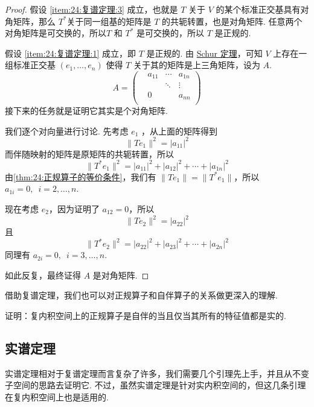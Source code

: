 \begin{proof}
    假设 \ref*{item:24:复谱定理:3} 成立，也就是 $ T $ 关于 $ V $ 的某个标准正交基具有对角矩阵，那么 $ T^* $关于同一组基的矩阵是 $ T $ 的共轭转置，也是对角矩阵. 任意两个对角矩阵是可交换的，所以$ T $ 和 $ T^* $ 是可交换的，所以 $ T $ 是正规的.

    假设 \ref*{item:24:复谱定理:1} 成立，即 $ T $ 是正规的. 由 \hyperref[thm:23:Schur]{Schur 定理}，可知 $ V $ 上存在一组标准正交基 $ (e_1, \ldots , e_n) $ 使得 $ T $ 关于其的矩阵是上三角矩阵，设为 $ A $.
    \[ A = \begin{pmatrix}
             & a_{11} & \cdots & a_{1n} \\
             &        & \ddots & \vdots \\
             & 0      &        & a_{nn} \\
        \end{pmatrix} \]
    接下来的任务就是证明它其实是个对角矩阵.

    我们逐个对向量进行讨论. 先考虑 $ e_1 $ ，从上面的矩阵得到
    \[ \lVert Te_1 \rVert^2 = \lvert a_{11} \rvert^2 \]
    而伴随映射的矩阵是原矩阵的共轭转置，所以
    \[ \lVert T^*e_1 \rVert^2 = \lvert a_{11} \rvert^2 + \lvert a_{12} \rvert^2 + \cdots + \lvert a_{1n} \rvert^2 \]
    由\autoref{thm:24:正规算子的等价条件}，我们有 $ \lVert Te_1 \rVert = \lVert T^*e_1 \rVert $，所以 $ a_{1i} = 0,\enspace i = 2, \ldots , n $.

    现在考虑 $ e_2 $，因为证明了 $ a_{12} = 0 $，所以
    \[ \lVert Te_2 \rVert^2 = \lvert a_{22} \rvert^2 \]
    且
    \[ \lVert T^*e_2 \rVert^2 = \lvert a_{22} \rvert^2 + \lvert a_{23} \rvert^2 + \cdots + \lvert a_{2n} \rvert^2 \]
    同理有 $ a_{2i} = 0,\enspace i = 3, \ldots , n $.

    如此反复，最终证得 $ A $ 是对角矩阵.
\end{proof}

借助复谱定理，我们也可以对正规算子和自伴算子的关系做更深入的理解.

\begin{example}
    证明：复内积空间上的正规算子是自伴的当且仅当其所有的特征值都是实的.
\end{example}

\subsection{实谱定理}

实谱定理相对于复谱定理而言复杂了许多，我们需要几个引理先上手，并且从不变子空间的思路去证明它. 不过，虽然实谱定理是针对实内积空间的，但这几条引理在复内积空间上也是适用的.

